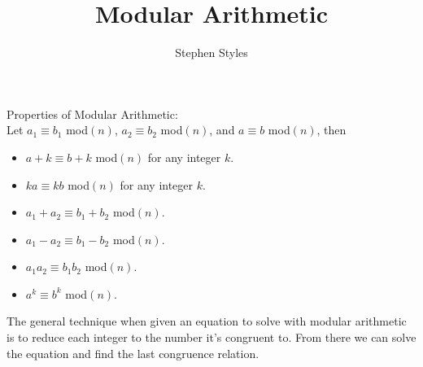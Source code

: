 \documentclass[16pt]{article}
\title{Modular Arithmetic}
\author{Stephen Styles}
\theoremstyle{remark}
\begin{document}
\maketitle
Properties of Modular Arithmetic:\\
Let $a_1 \equiv b_1$ mod$(n)$, $a_2 \equiv b_2$ mod$(n)$, and $a \equiv b$ mod$(n)$, then
\begin{itemize}
\item $a+k \equiv b+k $ mod$(n)$ for any integer $k$.
\item $ka \equiv kb$ mod$(n)$ for any integer $k$.
\item $a_1 + a_2 \equiv b_1 + b_2$ mod$(n)$.
\item $a_1 - a_2 \equiv b_1 - b_2$ mod$(n)$.
\item $a_1 a_2 \equiv b_1 b_2$ mod$(n)$.
\item $a^k \equiv b^k$ mod$(n)$.
\end{itemize} 

The general technique when given an equation to solve with modular arithmetic is to reduce each integer to the number it's congruent to. From there we can solve the equation and find the last congruence relation.\\
\end{document}
